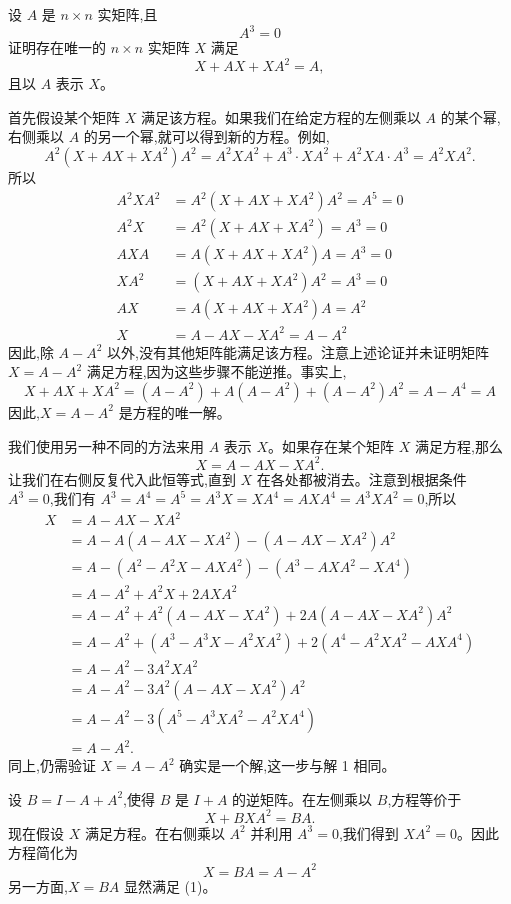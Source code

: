 \begin{questions}
    \question 设 $A$ 是 $n \times n$ 实矩阵,且 
    \[
    A^3 = 0
    \]
    证明存在唯一的 $n \times n$ 实矩阵 $X$ 满足
    \[
    X + AX + XA^2 = A,
    \]
    且以 $A$ 表示 $X$。
    \begin{solution}
        首先假设某个矩阵 $X$ 满足该方程。如果我们在给定方程的左侧乘以 $A$ 的某个幂,右侧乘以 $A$ 的另一个幂,就可以得到新的方程。例如,
        \[ A^2(X + AX + XA^2)A^2 = A^2XA^2 + A^3 \cdot XA^2 + A^2XA \cdot A^3 = A^2XA^2. \]
        所以
        \begin{align*}
        A^2XA^2 &= A^2(X + AX + XA^2)A^2 = A^5 = 0 \\
        A^2X &= A^2(X + AX + XA^2) = A^3 = 0 \\
        AXA &= A(X + AX + XA^2)A = A^3 = 0 \\
        XA^2 &= (X + AX + XA^2)A^2 = A^3 = 0 \\
        AX &= A(X + AX + XA^2)A = A^2 \\
        X &= A - AX - XA^2 = A - A^2
        \end{align*}
        因此,除 $A - A^2$ 以外,没有其他矩阵能满足该方程。注意上述论证并未证明矩阵 $X = A - A^2$ 满足方程,因为这些步骤不能逆推。事实上,
        \[ 
        X + AX + XA^2 = (A - A^2) + A(A - A^2) + (A - A^2)A^2 = A - A^4 = A
        \]
        因此,$X = A - A^2$ 是方程的唯一解。
    \end{solution}
    \begin{solution}
        我们使用另一种不同的方法来用 $A$ 表示 $X$。如果存在某个矩阵 $X$ 满足方程,那么
        \[ 
        X = A - AX - XA^2. 
        \]
        让我们在右侧反复代入此恒等式,直到 $X$ 在各处都被消去。注意到根据条件 $A^3 = 0$,我们有 $A^3 = A^4 = A^5 = A^3X = XA^4 = AXA^4 = A^3XA^2 = 0$,所以
        \begin{align*}
        X &= A - AX - XA^2 \\
        &= A - A(A - AX - XA^2) - (A - AX - XA^2)A^2 \\
        &= A - (A^2 - A^2X - AXA^2) - (A^3 - AXA^2 - XA^4) \\
        &= A - A^2 + A^2X + 2AXA^2 \\
        &= A - A^2 + A^2(A - AX - XA^2) + 2A(A - AX - XA^2)A^2 \\
        &= A - A^2 + (A^3 - A^3X - A^2XA^2) + 2(A^4 - A^2XA^2 - AXA^4) \\
        &= A - A^2 - 3A^2XA^2 \\
        &= A - A^2 - 3A^2(A - AX - XA^2)A^2 \\
        &= A - A^2 - 3(A^5 - A^3XA^2 - A^2XA^4) \\
        &= A - A^2.
        \end{align*}
        同上,仍需验证 $X = A - A^2$ 确实是一个解,这一步与解 1 相同。
    \end{solution}
    \begin{solution}
        设 $B = I - A + A^2$,使得 $B$ 是 $I + A$ 的逆矩阵。在左侧乘以 $B$,方程等价于
        \[ 
        X + BXA^2 = BA. \tag{1} 
        \]
        现在假设 $X$ 满足方程。在右侧乘以 $A^2$ 并利用 $A^3 = 0$,我们得到 $XA^2 = 0$。因此方程简化为 
        \[
        X = BA = A - A^2
        \]
        另一方面,$X = BA$ 显然满足 (1)。
    \end{solution}


\end{questions}
